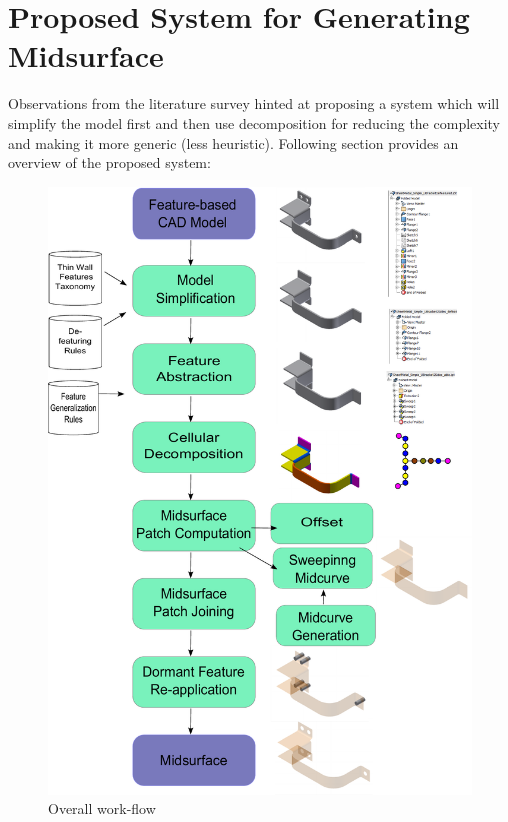 \section{Proposed System for Generating Midsurface}
\label{sec:approach}
Observations from the literature survey hinted at proposing a system which will simplify the model first and then use decomposition for reducing the complexity and making it more generic (less heuristic). Following section provides an overview of the proposed system:

    \begin{figure}[!htp]
	\centering 
	\includegraphics[width=0.5\linewidth]{../Common/images/SystemArchitecture_nolabels_5.pdf}
	\caption{Overall work-flow}
	\label{fig_sysarch}
    \end{figure}


